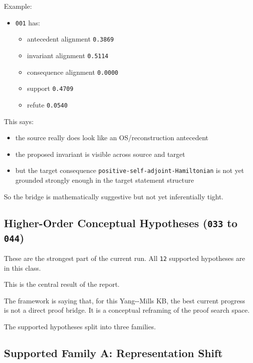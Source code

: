 \documentclass[
]{article}
\providecommand{\tightlist}{%
  \setlength{\itemsep}{0pt}\setlength{\parskip}{0pt}}
\begin{document}
Example:

\begin{itemize}
\tightlist
\item
  \texttt{001} has:

  \begin{itemize}
  \tightlist
  \item
    antecedent alignment \texttt{0.3869}
  \item
    invariant alignment \texttt{0.5114}
  \item
    consequence alignment \texttt{0.0000}
  \item
    support \texttt{0.4709}
  \item
    refute \texttt{0.0540}
  \end{itemize}
\end{itemize}

This says:

\begin{itemize}
\tightlist
\item
  the source really does look like an OS/reconstruction antecedent
\item
  the proposed invariant is visible across source and target
\item
  but the target consequence \texttt{positive-self-adjoint-Hamiltonian}
  is not yet grounded strongly enough in the target statement structure
\end{itemize}

So the bridge is mathematically suggestive but not yet inferentially
tight.

\subsection{\texorpdfstring{Higher-Order Conceptual Hypotheses
(\texttt{033} to
\texttt{044})}{Higher-Order Conceptual Hypotheses (033 to 044)}}\label{higher-order-conceptual-hypotheses-033-to-044}

These are the strongest part of the current run. All \texttt{12}
supported hypotheses are in this class.

This is the central result of the report.

The framework is saying that, for this Yang-\/-Mills KB, the best
current progress is not a direct proof bridge. It is a conceptual
reframing of the proof search space.

The supported hypotheses split into three families.

\subsection{Supported Family A: Representation
Shift}\label{supported-family-a-representation-shift}
\end{document}
